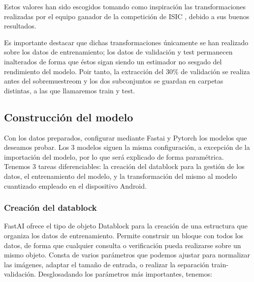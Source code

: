 Estos valores han sido escogidos tomando como inspiración las transformaciones realizadas por el equipo ganador de la competición de ISIC \cite{1stISIC}, debido a sus buenos resultados.

Es importante destacar que dichas transformaciones únicamente se han realizado sobre los datos de entrenamiento; los datos de validación y test permanecen inalterados de forma que éstos sigan siendo un estimador no sesgado del rendimiento del modelo. Poir tanto, la extracción del 30\% de validación se realiza antes del sobremuestreom y los dos subconjuntos se guardan en carpetas distintas, a las que llamaremos train y test.

\subsection{Construcción del modelo}

Con los datos preparados, configurar mediante Fastai y Pytorch los modelos que deseamos probar. Los 3 modelos siguen la misma configuración, a excepción de la importación del modelo, por lo  que será explicado de forma paramétrica. Tenemos 3 tareas diferenciables: la creación del datablock para la gestión de los datos, el entrenamiento del modelo, y la transformación del mismo al modelo cuantizado empleado en el dispositivo Android.

\subsubsection{Creación del datablock}

FastAI ofrece el tipo de objeto Datablock para la creación de una estructura que organiza los datos de entrenamiento. Permite construir un bloque con todos los datos, de forma que cualquier consulta o verificación pueda realizarse sobre un mismo objeto. Consta de varios parámetros que podemos ajustar para normalizar las imágenes, adaptar el tamaño de entrada, o realizar la separación train-validación. Desglosadando los parámetros más importantes, tenemos:

